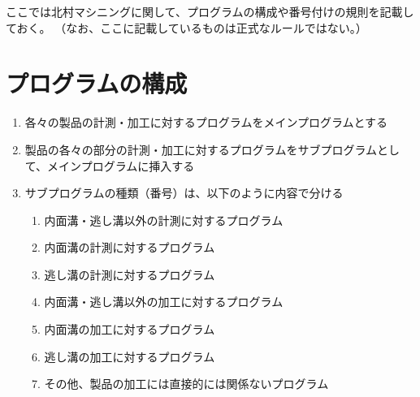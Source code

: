 
ここでは北村マシニングに関して、プログラムの構成や番号付けの規則を記載しておく。
（なお、ここに記載しているものは正式なルールではない。）


\section{プログラムの構成}
\begin{enumerate}
\item 各々の製品の計測・加工に対するプログラムをメインプログラムとする
\item 製品の各々の部分の計測・加工に対するプログラムをサブプログラムとして、メインプログラムに挿入する
\item サブプログラムの種類（番号）は、以下のように内容で分ける
  \begin{enumerate}
  \item 内面溝・逃し溝以外の計測に対するプログラム
  \item 内面溝の計測に対するプログラム
  \item 逃し溝の計測に対するプログラム
  \item 内面溝・逃し溝以外の加工に対するプログラム
  \item 内面溝の加工に対するプログラム
  \item 逃し溝の加工に対するプログラム
  \item その他、製品の加工には直接的には関係ないプログラム
  \end{enumerate}
\end{enumerate}



